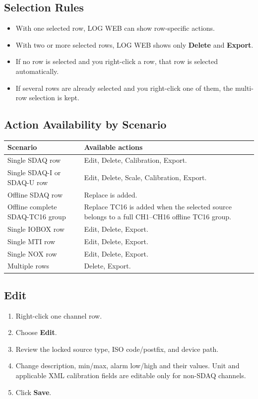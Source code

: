 \documentclass[11pt,a4paper]{article}
\begin{document}
\subsection{Selection Rules}
\begin{itemize}
\item With one selected row, LOG WEB can show row-specific actions.
\item With two or more selected rows, LOG WEB shows only \textbf{Delete} and \textbf{Export}.
\item If no row is selected and you right-click a row, that row is selected automatically.
\item If several rows are already selected and you right-click one of them, the multi-row selection is kept.
\end{itemize}

\subsection{Action Availability by Scenario}
\begin{longtable}{|p{}|p{}|}
\hline
\textbf{Scenario} & \textbf{Available actions} \\
\hline
Single SDAQ row & Edit, Delete, Calibration, Export. \\
\hline
Single SDAQ-I or SDAQ-U row & Edit, Delete, Scale, Calibration, Export. \\
\hline
Offline SDAQ row & Replace is added. \\
\hline
Offline complete SDAQ-TC16 group & Replace TC16 is added when the selected source belongs to a full CH1--CH16 offline TC16 group. \\
\hline
Single IOBOX row & Edit, Delete, Export. \\
\hline
Single MTI row & Edit, Delete, Export. \\
\hline
Single NOX row & Edit, Delete, Export. \\
\hline
Multiple rows & Delete, Export. \\
\hline
\end{longtable}

\subsection{Edit}
\begin{enumerate}
\item Right-click one channel row.
\item Choose \textbf{Edit}.
\item Review the locked source type, ISO code/postfix, and device path.
\item Change description, min/max, alarm low/high and their values. Unit and applicable XML calibration fields are editable only for non-SDAQ channels.
\item Click \textbf{Save}.
\end{enumerate}
\end{document}
